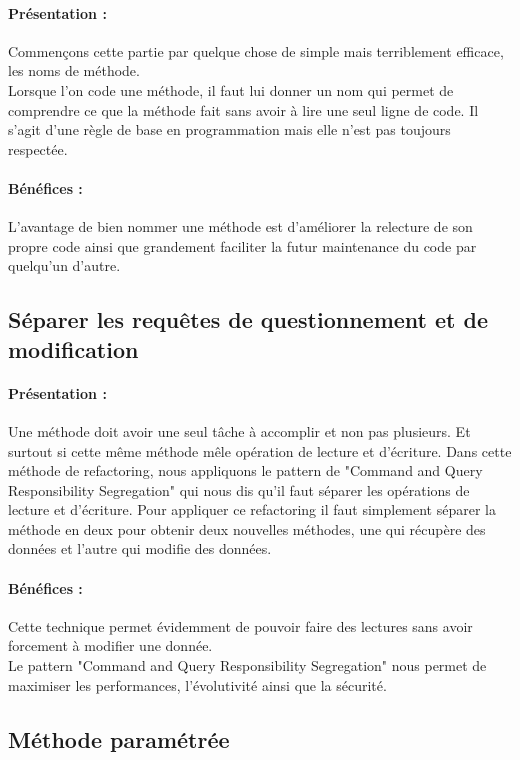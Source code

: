 \documentclass[a4paper,twoside,12pt,openright]{report}
\begin{document}
\paragraph{Présentation :}
Commençons cette partie par quelque chose de simple mais terriblement efficace, les noms de méthode.\\
Lorsque l'on code une méthode, il faut lui donner un nom qui permet de comprendre ce que la méthode fait sans avoir à lire une seul ligne de code. Il s'agit d'une règle de base en programmation mais elle n'est pas toujours respectée.

\paragraph{Bénéfices :}
L'avantage de bien nommer une méthode est d'améliorer la relecture de son propre code ainsi que grandement faciliter la futur maintenance du code par quelqu'un d'autre.\\

\subsection{Séparer les requêtes de questionnement et de modification}
\paragraph{Présentation :}
Une méthode doit avoir une seul tâche à accomplir et non pas plusieurs. Et surtout si cette même méthode mêle opération de lecture et d'écriture.
Dans cette méthode de refactoring, nous appliquons le pattern de "Command and Query Responsibility Segregation" qui nous dis qu'il faut séparer les opérations de lecture et d'écriture.
Pour appliquer ce refactoring il faut simplement séparer la méthode en deux pour obtenir deux nouvelles méthodes, une qui récupère des données et l'autre qui modifie des données.

\paragraph{Bénéfices :}
Cette technique permet évidemment de pouvoir faire des lectures sans avoir forcement à modifier une donnée.\\
Le pattern "Command and Query Responsibility Segregation" nous permet de maximiser les performances, l'évolutivité ainsi que la sécurité.\\

\subsection{Méthode paramétrée}
\end{document}
